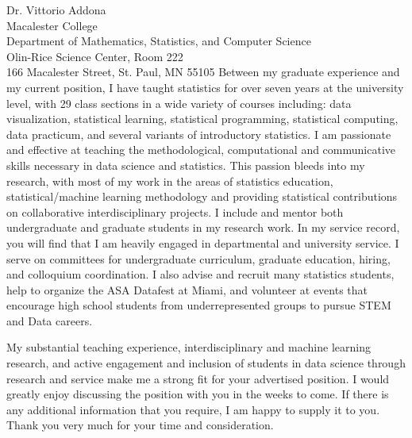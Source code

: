 \documentclass[11pt]{letter}\usepackage[]{graphicx}\usepackage[]{color}
\begin{document}
\begin{letter}{Dr. Vittorio Addona \\
Macalester College \\
Department of Mathematics, Statistics, and Computer Science\\
Olin-Rice Science Center, Room 222\\
166 Macalester Street, St. Paul, MN  55105
}
Between my graduate experience and my current position, I have taught statistics for over seven years at the university level, with 29 class sections in a wide variety of courses including: data visualization, statistical learning, statistical programming, statistical computing, data practicum, and several variants of introductory statistics. I am passionate and effective at teaching the methodological, computational and communicative skills necessary in data science and statistics. This passion bleeds into my research, with most of my work in the areas of statistics education, statistical/machine learning methodology and providing statistical contributions on collaborative interdisciplinary projects. I include and mentor both undergraduate and graduate students in my research work. In my service record, you will find that I am heavily engaged in departmental and university service. I serve on committees for undergraduate curriculum, graduate education, hiring, and colloquium coordination. I also advise and recruit many statistics students, help to organize the ASA Datafest at Miami, and volunteer at events that encourage high school students from underrepresented groups to pursue STEM and Data careers. 


My substantial teaching experience, interdisciplinary and machine learning research, and active engagement and inclusion of students in data science through research and service make me a strong fit for your advertised position. I would greatly enjoy discussing the position with you in the weeks to come. If there is any additional information that you require, I am happy to supply it to you. Thank you very much for your time and consideration.


\end{letter}
\end{document}
